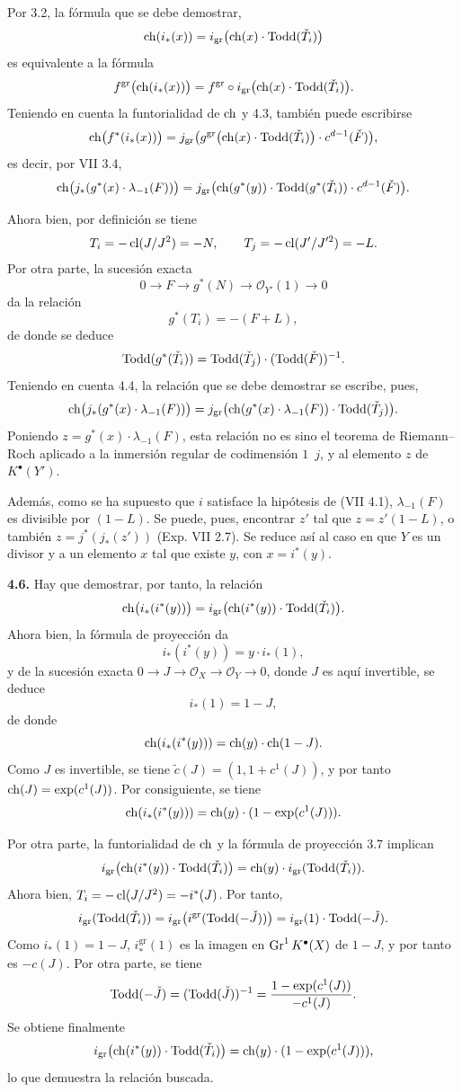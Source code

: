 Por 3.2, la fórmula que se debe demostrar,
\[
 \operatorname{ch}(i_*(x))=
 i_{\mathrm{gr}}\bigl(\operatorname{ch}(x)\cdot\operatorname{Todd}(\check T_i)\bigr)
\]
es equivalente a la fórmula
\[
 f^{\mathrm{gr}}\bigl(\operatorname{ch}(i_*(x))\bigr)
 =
 f^{\mathrm{gr}}\circ i_{\mathrm{gr}}\bigl(\operatorname{ch}(x)\cdot\operatorname{Todd}(\check T_i)\bigr).
\]
Teniendo en cuenta la funtorialidad de \(\operatorname{ch}\) y 4.3, también puede escribirse
\[
 \operatorname{ch}\bigl(f^*(i_*(x))\bigr)
 =
 j_{\mathrm{gr}}\bigl(g^{\mathrm{gr}}\bigl(\operatorname{ch}(x)\cdot\operatorname{Todd}(\check T_i)\bigr)\cdot c^{d-1}(\check F)\bigr),
\]
es decir, por VII 3.4,
\[
 \operatorname{ch}\bigl(j_*(g^*(x)\cdot\lambda_{-1}(F))\bigr)
 =
 j_{\mathrm{gr}}\bigl(\operatorname{ch}(g^*(y))\cdot\operatorname{Todd}(g^*(\check T_i))\cdot c^{d-1}(\check F)\bigr).
\]

Ahora bien, por definición se tiene
\[
 T_i=-\operatorname{cl}(J/J^2)=-N,\qquad
 T_j=-\operatorname{cl}(J'/J'^2)=-L.
\]
Por otra parte, la sucesión exacta
\[
0\longrightarrow F\longrightarrow g^*(N)\longrightarrow \mathcal O_{Y'}(1)\longrightarrow0
\]
da la relación
\[
 g^*(T_i)=-(F+L),
\]
de donde se deduce
\[
 \operatorname{Todd}(g^*(\check T_i))=\operatorname{Todd}(\check T_j)\cdot(\operatorname{Todd}(\check F))^{-1}.
\]
Teniendo en cuenta 4.4, la relación que se debe demostrar se escribe, pues,
\[
 \operatorname{ch}\bigl(j_*(g^*(x)\cdot\lambda_{-1}(F))\bigr)
 =
 j_{\mathrm{gr}}\bigl(\operatorname{ch}(g^*(x)\cdot\lambda_{-1}(F))\cdot\operatorname{Todd}(\check T_j)\bigr).
\]
Poniendo \(z=g^*(x)\cdot\lambda_{-1}(F)\), esta relación no es sino el teorema
de Riemann--Roch aplicado a la inmersión regular de codimensión \(1\)~\(j\), y
al elemento \(z\) de \(K^{\bullet}(Y')\).

Además, como se ha supuesto que \(i\) satisface la hipótesis de (VII 4.1),
\(\lambda_{-1}(F)\) es divisible por \((1-L)\). Se puede, pues, encontrar
\(z'\) tal que \(z=z'(1-L)\), o también \(z=j^*(j_*(z'))\) (Exp. VII 2.7). Se
reduce así al caso en que \(Y\) es un divisor y a un elemento \(x\) tal
que existe \(y\), con \(x=i^*(y)\).

\textbf{4.6.} Hay que demostrar, por tanto, la relación
\[
 \operatorname{ch}\bigl(i_*(i^*(y))\bigr)
 =
 i_{\mathrm{gr}}\bigl(\operatorname{ch}(i^*(y))\cdot\operatorname{Todd}(\check T_i)\bigr).
\]
Ahora bien, la fórmula de proyección da
\[
 i_*(i^*(y))=y\cdot i_*(1),
\]
y de la sucesión exacta
\(0\longrightarrow J\longrightarrow\mathcal O_X\longrightarrow\mathcal O_Y\longrightarrow0\),
donde \(J\) es aquí invertible, se deduce
\[
 i_*(1)=1-J,
\]
de donde
\[
 \operatorname{ch}(i_*(i^*(y)))=\operatorname{ch}(y)\cdot\operatorname{ch}(1-J).
\]
Como \(J\) es invertible, se tiene
\(\widetilde c(J)=(1,1+c^1(J))\), y por tanto
\(\operatorname{ch}(J)=\exp(c^1(J))\).
Por consiguiente, se tiene
\[
 \operatorname{ch}(i_*(i^*(y)))=\operatorname{ch}(y)\cdot(1-\exp(c^1(J))).
\]

Por otra parte, la funtorialidad de \(\operatorname{ch}\) y la fórmula de proyección 3.7
implican
\[
 i_{\mathrm{gr}}\bigl(\operatorname{ch}(i^*(y))\cdot\operatorname{Todd}(\check T_i)\bigr)
 =
 \operatorname{ch}(y)\cdot i_{\mathrm{gr}}(\operatorname{Todd}(\check T_i)).
\]
Ahora bien, \(T_i=-\operatorname{cl}(J/J^2)=-i^*(J)\). Por tanto,
\[
 i_{\mathrm{gr}}(\operatorname{Todd}(\check T_i))
 =
 i_{\mathrm{gr}}\bigl(i^{\mathrm{gr}}(\operatorname{Todd}(-\check J))\bigr)
 =
 i_{\mathrm{gr}}(1)\cdot\operatorname{Todd}(-\check J).
\]
Como \(i_*(1)=1-J\), \(i^{\mathrm{gr}}_*(1)\) es la imagen en
\(\operatorname{Gr}^1K^{\bullet}(X)\) de \(1-J\), y por tanto es \(-c(J)\). Por otra parte,
se tiene
\[
 \operatorname{Todd}(-\check J)=(\operatorname{Todd}(\check J))^{-1}
 =
 \frac{1-\exp(c^1(J))}{-c^1(J)}.
\]
Se obtiene finalmente
\[
 i_{\mathrm{gr}}\bigl(\operatorname{ch}(i^*(y))\cdot\operatorname{Todd}(\check T_i)\bigr)
 =
 \operatorname{ch}(y)\cdot(1-\exp(c^1(J))),
\]
lo que demuestra la relación buscada.
